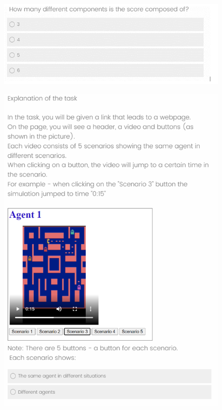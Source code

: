 \begin{figure}[t]
\centering
\includegraphics[width=0.7\linewidth]{survey_q.png}
\end{figure}
\begin{figure}[t]
\centering
\includegraphics[width=0.7\linewidth]{expla_task.png}
\end{figure}
